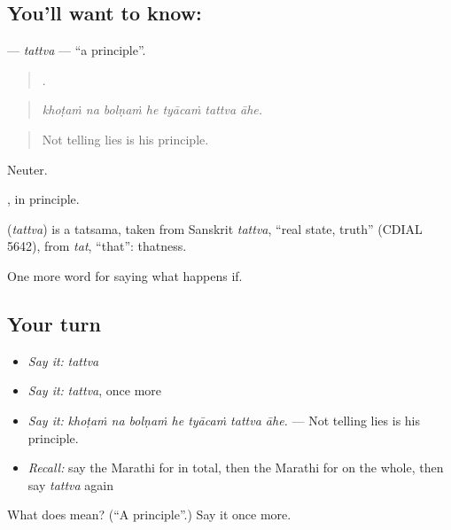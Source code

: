 \subsection*{You'll want to know: }
\textbf{} — \emph{tattva} — \textquotedblleft{}a principle\textquotedblright{}.

\begin{quote}
      .
\end{quote}

\begin{quote}
\emph{khoṭaṁ na bolṇaṁ he tyācaṁ tattva āhe.}
\end{quote}

\begin{quote}
Not telling lies is his principle.
\end{quote}

Neuter.

, in principle.

\begin{cousinweb}
\textbf{} (\emph{tattva}) is a tatsama, taken from Sanskrit \emph{tattva}, \textquotedblleft{}real state, truth\textquotedblright{} (CDIAL 5642), from \emph{tat}, \textquotedblleft{}that\textquotedblright{}: thatness.
\end{cousinweb}

\begin{grammarlens}[title={What you've built}]
One more word for saying what happens if.
\end{grammarlens}

\subsection*{Your turn}
\begin{itemize}
\raggedright
  \item \emph{Say it:} \emph{tattva}
  \item \emph{Say it:} \emph{tattva}, once more
  \item \emph{Say it:} \emph{khoṭaṁ na bolṇaṁ he tyācaṁ tattva āhe.} — Not telling lies is his principle.
  \item \emph{Recall:} say the Marathi for in total, then the Marathi for on the whole, then say \emph{tattva} again
\end{itemize}

\begin{tcolorbox}[breakable,colback=teal!4,colframe=teal!35!black,title={Before you move on}]
What does  mean? (\textquotedblleft{}A principle\textquotedblright{}.) Say it once more.
\end{tcolorbox}
